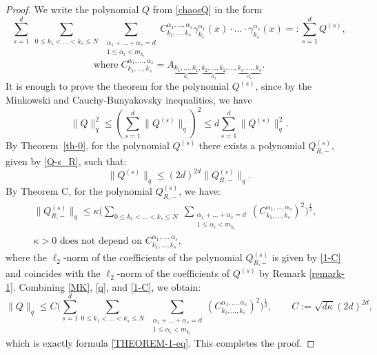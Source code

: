 \documentclass[12pt]{article}
\begin{document}
	\begin{proof} We write the polynomial $Q$ from \eqref{chaosQ} in the form
		\begin{equation} \label{C-A}
			\sum_{s=1}^{d} \; \sum_{0\le k_1 < \ldots < k_s \le N} \; \sum_{\substack{\alpha_1+\ldots+\alpha_s = d \\ 1 \le \alpha_i < m_{k_i}}} C_{k_1, \ldots, k_s}^{\alpha_1, \ldots, \alpha_s} \gamma_{k_1}^{\alpha_1}(x) \cdot \ldots \cdot \gamma_{k_s}^{\alpha_s}(x) =: \sum_{s=1}^{d} Q^{(s)},  
		\end{equation} 
		\begin{equation*} 
			\text{where}\; C_{k_1, \dots, k_s}^{\alpha_1, \dots, \alpha_s} = A_{\underbrace{k_1, \dots, k_1}_{\alpha_1}, \underbrace{k_2, \dots, k_2}_{\alpha_2}, \dots, \underbrace{k_s, \dots, k_s}_{\alpha_s}}.
		\end{equation*}
		It is enough to prove the theorem for the polynomial $Q^{(s)}$, since by the Minkowski and Cauchy-Bunyakovsky inequalities, we have
		\begin{equation} \label{MK}
			\|Q\|^2_q \le \left(\sum_{s=1}^d \|Q^{(s)}\|_q\right)^2 \le d \sum_{s=1}^d \|Q^{(s)}\|_q^2. 
		\end{equation}
By Theorem~\ref{th-0}, for the polynomial $Q^{(s)}$ there exists a polynomial $Q^{(s)}_{R,-}$, given by \eqref{Q-s_R}, such that: 
		\begin{equation} \label{q}
			\|Q^{(s)}\|_q \le (2d)^{2d}\|Q^{(s)}_{R, -}\|_q.
		\end{equation}
	By Theorem C, for the polynomial $Q^{(s)}_{R, -}$, we have:
		\begin{equation} \label{1-C}
        \begin{split}
            \|Q^{(s)}_{R, -}\|_q \le \kappa \biggl(\sum_{0\le k_1 < \ldots < k_s \le N} \; \sum_{\substack{\alpha_1+\ldots+\alpha_s = d \\ 1 \le \alpha_i < m_{k_i}}} \left(C_{k_1, \ldots, k_s}^{\alpha_1, \ldots, \alpha_s}\right)^2\biggl)^{\frac{1}{2}}, & \\
            \text{$\kappa>0$ does not depend on $C_{k_1, \ldots, k_s}^{\alpha_1, \ldots, \alpha_s}$},&
        \end{split}
		\end{equation}
		where the $\ell_2$-norm of the coefficients of the polynomial $Q^{(s)}_{R, -}$ is given by \eqref{1-C} and coincides with the $\ell_2$-norm of the coefficients of $Q^{(s)}$ by Remark \ref{remark-1}. Combining \eqref{MK}, \eqref{q}, and \eqref{1-C}, we obtain:
		\[
		\|Q\|_q \le C \biggl(\sum_{s=1}^{d}\sum_{0\le k_1 < \ldots < k_s \le N} \; \sum_{\substack{\alpha_1+\ldots+\alpha_s = d \\ 1 \le \alpha_i < m_{k_i}}} \left(C_{k_1, \ldots, k_s}^{\alpha_1, \ldots, \alpha_s}\right)^2\biggl)^{\frac{1}{2}}, \qquad C := \sqrt{d \kappa} (2d)^{2d},
		\]
		which is exactly formula \eqref{THEOREM-1-eq}. This completes the proof.
	\end{proof}	
\end{document}
